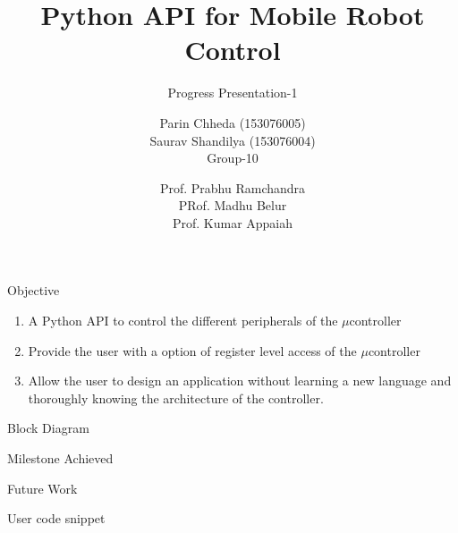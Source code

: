 \documentclass[10pt,handout,english]{beamer}
\title[] %
{Python API for Mobile Robot Control}
\subtitle{Progress Presentation-1}
\author[AE-663 Course Project ] %
{Parin Chheda (153076005) \\ Saurav Shandilya (153076004) \\ Group-10 }
\institute [Indian Institute of Technology Bombay]%
{
  
}
\date[\today] %
{Prof. Prabhu Ramchandra \\ PRof. Madhu Belur \\ Prof. Kumar Appaiah}
\begin{document}
 
\frame{\titlepage}

\begin{frame}{Objective}
\begin{enumerate}
	\item A Python API to control the different peripherals of the ${\mu}$controller
	\item Provide the user with a option of register level access of the ${\mu}$controller
	\item Allow the user to design an application without learning a new language and thoroughly knowing the architecture of the controller.
\end{enumerate}
\end{frame}

\begin{frame}{Block Diagram}

\end{frame}

\begin{frame}{Milestone Achieved}

\end{frame}

\begin{frame}{Future Work}

\end{frame}

\begin{frame}{User code snippet}
	
\end{frame}
\end{document}
